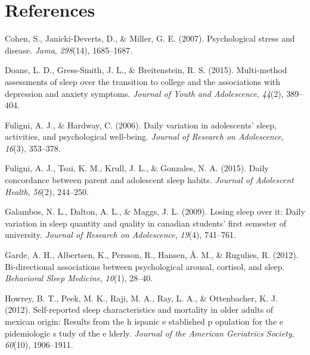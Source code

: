 \documentclass[man, fleqn, noextraspace]{apa6}
\begin{document}
\newpage

\hypertarget{references}{%
\section{References}\label{references}}

\begingroup
\setlength{\parindent}{-0.5in}
\setlength{\leftskip}{0.5in}

\hypertarget{refs}{}
\leavevmode\hypertarget{ref-cohen2007_psych}{}%
Cohen, S., Janicki-Deverts, D., \& Miller, G. E. (2007). Psychological stress and disease. \emph{Jama}, \emph{298}(14), 1685--1687.

\leavevmode\hypertarget{ref-doane2015multi}{}%
Doane, L. D., Gress-Smith, J. L., \& Breitenstein, R. S. (2015). Multi-method assessments of sleep over the transition to college and the associations with depression and anxiety symptoms. \emph{Journal of Youth and Adolescence}, \emph{44}(2), 389--404.

\leavevmode\hypertarget{ref-fuligni2006daily}{}%
Fuligni, A. J., \& Hardway, C. (2006). Daily variation in adolescents' sleep, activities, and psychological well-being. \emph{Journal of Research on Adolescence}, \emph{16}(3), 353--378.

\leavevmode\hypertarget{ref-fuligni2015daily}{}%
Fuligni, A. J., Tsai, K. M., Krull, J. L., \& Gonzales, N. A. (2015). Daily concordance between parent and adolescent sleep habits. \emph{Journal of Adolescent Health}, \emph{56}(2), 244--250.

\leavevmode\hypertarget{ref-galambos2009losing}{}%
Galambos, N. L., Dalton, A. L., \& Maggs, J. L. (2009). Losing sleep over it: Daily variation in sleep quantity and quality in canadian students' first semester of university. \emph{Journal of Research on Adolescence}, \emph{19}(4), 741--761.

\leavevmode\hypertarget{ref-garde_2012_bi}{}%
Garde, A. H., Albertsen, K., Persson, R., Hansen, Å. M., \& Rugulies, R. (2012). Bi-directional associations between psychological arousal, cortisol, and sleep. \emph{Behavioral Sleep Medicine}, \emph{10}(1), 28--40.

\leavevmode\hypertarget{ref-howrey2012self}{}%
Howrey, B. T., Peek, M. K., Raji, M. A., Ray, L. A., \& Ottenbacher, K. J. (2012). Self-reported sleep characteristics and mortality in older adults of mexican origin: Results from the h ispanic e stablished p opulation for the e pidemiologic s tudy of the e lderly. \emph{Journal of the American Geriatrics Society}, \emph{60}(10), 1906--1911.
\end{document}
